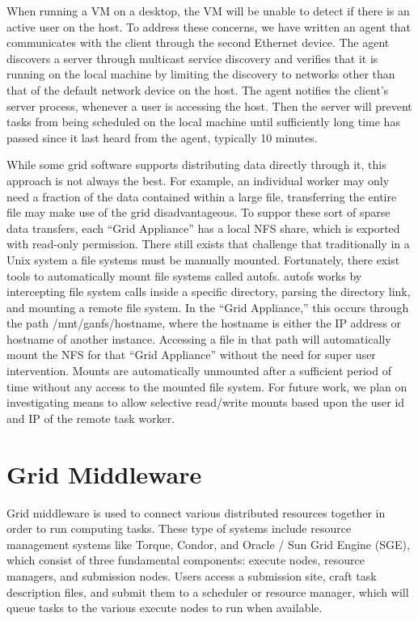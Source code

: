 \documentclass[conference]{IEEEtran}
\begin{document}
When running a VM on a desktop, the VM will be unable to detect if there is an
active user on the host.  To address these concerns, we have written an agent
that communicates with the client through the second Ethernet device.  The
agent discovers a server through multicast service discovery and verifies that
it is running on the local machine by limiting the discovery to networks other
than that of the default network device on the host.  The agent notifies the
client's server process, whenever a user is accessing the host.  Then the
server will prevent tasks from being scheduled on the local machine until
sufficiently long time has passed since it last heard from the agent, typically
10 minutes.

While some grid software supports distributing data directly through it, this
approach is not always the best.  For example, an individual worker may only
need a fraction of the data contained within a large file, transferring the
entire file may make use of the grid disadvantageous.  To suppor these sort of
sparse data transfers, each ``Grid Appliance'' has a local NFS share, which is
exported with read-only permission.  There still exists that challenge that
traditionally in a Unix system a file systems must be manually mounted.
Fortunately, there exist tools to automatically mount file systems called
autofs.  autofs works by intercepting file system calls inside a specific
directory, parsing the directory link, and mounting a remote file system.  In
the ``Grid Appliance,'' this occurs through the path /mnt/ganfs/hostname, where
the hostname is either the IP address or hostname of another instance.
Accessing a file in that path will automatically mount the NFS for that ``Grid
Appliance'' without the need for super user intervention.  Mounts are
automatically unmounted after a sufficient period of time without any access to
the mounted file system.  For future work, we plan on investigating means to
allow selective read/write mounts based upon the user id and IP of the remote
task worker.

\section{Grid Middleware}
\label{middleware}

Grid middleware is used to connect various distributed resources together in
order to run computing tasks.  These type of systems include resource
management systems like Torque, Condor, and Oracle / Sun Grid Engine (SGE),
which consist of three fundamental components: execute nodes, resource
managers, and submission nodes.  Users access a submission site, craft task
description files, and submit them to a scheduler or resource manager, which
will queue tasks to the various execute nodes to run when available.
\end{document}

